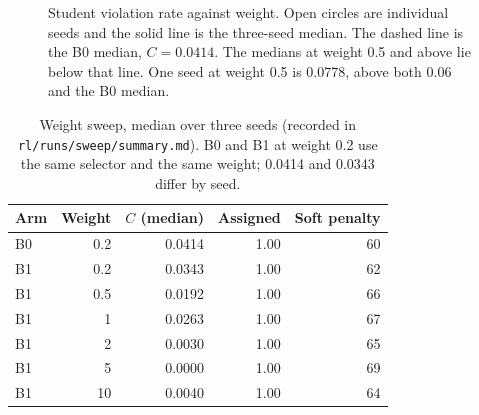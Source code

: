 \begin{figure}[H]
\centering
{}
\caption{Student violation rate against weight. Open circles are individual seeds and the solid
line is the three-seed median. The dashed line is the B0 median, $C = 0.0414$. The medians at
weight 0.5 and above lie below that line. One seed at weight 0.5 is 0.0778, above both 0.06 and
the B0 median.}
\label{fig:sweep}
\end{figure}

\begin{table}[H]
\centering
\caption{Weight sweep, median over three seeds (recorded in \texttt{rl/runs/sweep/summary.md}).
B0 and B1 at weight 0.2 use the same selector and the same weight; 0.0414 and 0.0343 differ by seed.}
\label{tab:sweep}
\footnotesize
\begin{tabular}{@{}lrrrr@{}}
\toprule
\textbf{Arm} & \textbf{Weight} & \textbf{$C$ (median)} & \textbf{Assigned} & \textbf{Soft penalty} \\
\midrule
B0 & 0.2  & 0.0414 & 1.00 & 60 \\
B1 & 0.2  & 0.0343 & 1.00 & 62 \\
B1 & 0.5  & 0.0192 & 1.00 & 66 \\
B1 & 1    & 0.0263 & 1.00 & 67 \\
B1 & 2    & 0.0030 & 1.00 & 65 \\
B1 & 5    & 0.0000 & 1.00 & 69 \\
B1 & 10   & 0.0040 & 1.00 & 64 \\
\bottomrule
\end{tabular}
\end{table}

